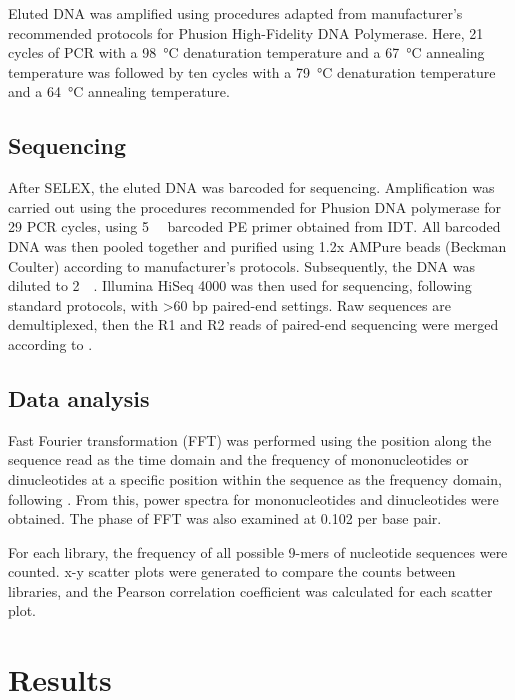\documentclass[parskip=full, numbers=noenddot]{scrreprt}
\begin{document}
Eluted DNA was amplified using procedures adapted from manufacturer's recommended protocols for Phusion High-Fidelity DNA Polymerase.  Here, 21 cycles of PCR with a \SI{98}{\celsius} denaturation temperature and a \SI{67}{\celsius} annealing temperature was followed by ten cycles with a \SI{79}{\celsius} denaturation temperature and a \SI{64}{\celsius} annealing temperature.

\subsection{Sequencing}
\label{ssec:emsaselex_methods_seq}

After SELEX, the eluted DNA was barcoded for sequencing.  Amplification was carried out using the procedures recommended for Phusion DNA polymerase for 29 PCR cycles, using \SI{5}{\micro\Molar} barcoded PE primer obtained from IDT.  All barcoded DNA was then pooled together and purified using 1.2x AMPure beads (Beckman Coulter) according to manufacturer's protocols.  Subsequently, the DNA was diluted to \SI{2}{\nano\Molar}.  Illumina HiSeq 4000 was then used for sequencing, following standard protocols, with >60 bp paired-end settings.  Raw sequences are demultiplexed, then the R1 and R2 reads of paired-end sequencing were merged according to \citet{zhu_interaction_2018}.

\subsection{Data analysis}
\label{ssec:emsaselex_methods_anal}

Fast Fourier transformation (FFT) was performed using the position along the sequence read as the time domain and the frequency of mononucleotides or dinucleotides at a specific position within the sequence as the frequency domain, following \citet{zhu_interaction_2018}.  From this, power spectra for mononucleotides and dinucleotides were obtained.  The phase of FFT was also examined at 0.102 per base pair.

For each library, the frequency of all possible 9-mers of nucleotide sequences were counted.  x-y scatter plots were generated to compare the counts between libraries, and the Pearson correlation coefficient was calculated for each scatter plot.

\section{Results}
\label{sec:emsaselex_results}
\end{document}

